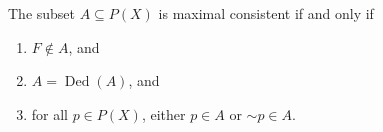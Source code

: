 The subset $A \subseteq P(X)$ is maximal consistent if and only if
\begin{enumerate}
\item $F \notin A$, and
\item $A = \operatorname{Ded}(A)$, and
\item for all $p \in P(X)$, either $p \in A$ or $\sim p \in A$.
\end{enumerate}
